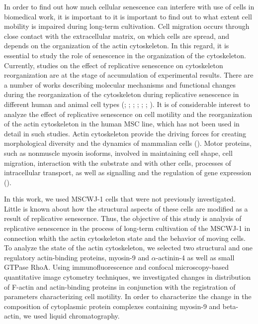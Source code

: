 \documentclass[alpha-refs]{wiley-article}
\begin{document}
In order to find out how much cellular senescence can interfere with use of cells in biomedical work, it is important to  it is important to find out to what extent cell mobility is impaired during long-term cultivation.
Cell migration occurs through close contact with the extracellular matrix, on which cells are spread, and depends on the organization of the actin cytoskeleton.
In this regard, it is essential to study the role of senescence in the organization of the cytoskeleton.
Currently, studies on the effect of replicative senescence on cytoskeleton reorganization are at the stage of accumulation of experimental results.
There are a number of works describing molecular mechanisms and functional changes during the reorganization of the cytoskeleton during replicative senescence in different human and animal cell types (\cite{larsen2003phosphatases}; \cite{le2008regulation}; \cite{wang2009protein}; \cite{geissler2012functional}; \cite{ozcan2016unbiased}; \cite{turinetto2016senescence}; \cite{moujaber2019cellular}).
It is of considerable interest to analyze the effect of replicative senescence on cell motility and the reorganization of the actin cytoskeleton in the human MSC line, which has not been used in detail in such studies.
Actin cytoskeleton provide the driving forces for creating morphological diversity and the dynamics of mammalian cells (\cite{vasiliev1991polarization}).
Motor proteins, such as nonmuscle myosin isoforms, involved in maintaining cell shape, cell migration, interaction with the substrate and with other cells, processes of intracellular transport, as well as signalling and the regulation of gene expression (\cite{omelchenko2002mechanisms}).

In this work, we used MSCWJ-1 cells that were not previously investigated.
Little is known about how the structural aspects of these cells are modified as a result of replicative senescence.
Thus, the objective of this study is analysis of replicative senescence in the process of long-term cultivation of the MSCWJ-1 in connection whith the actin cytoskeleton state and the behavior of moving cells.
To analyze the state of the actin cytoskeleton, we selected two structural and one regulatory actin-binding proteins, myosin-9 and $\alpha$-actinin-4 as well as small GTPase RhoA.
Using immunofluorescence and confocal microscopy-based quantitative image cytometry techniques, we investigated changes in distribution of F-actin and actin-binding proteins  in conjunction with the registration of parameters characterizing cell motility.
In order to characterize the change in the composition of cytoplasmic protein complexes containing myosin-9 and beta-actin, we used liquid chromatography.
\end{document}
